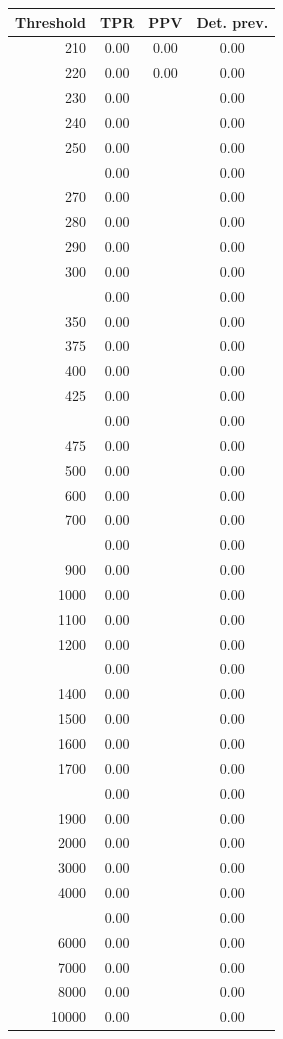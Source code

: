 \documentclass[12pt]{article}
\begin{document}
\begin{minipage}{0.5\textwidth}\small
\begin{tabular}{rccc}
\toprule
\textbf{Threshold} & \textbf{TPR} 
& \textbf{PPV} & \textbf{Det. prev.} \\
\midrule 
    210 & 0.00 & 0.00 & 0.00 \\ 
    220 & 0.00 & 0.00 & 0.00 \\ 
    230 & 0.00 &  & 0.00 \\ 
    240 & 0.00 &  & 0.00 \\ 
    250 & 0.00 &  & 0.00 \\  \addlinespace
    260 & 0.00 &  & 0.00 \\ 
    270 & 0.00 &  & 0.00 \\ 
    280 & 0.00 &  & 0.00 \\ 
    290 & 0.00 &  & 0.00 \\ 
    300 & 0.00 &  & 0.00 \\  \addlinespace
    325 & 0.00 &  & 0.00 \\ 
    350 & 0.00 &  & 0.00 \\ 
    375 & 0.00 &  & 0.00 \\ 
    400 & 0.00 &  & 0.00 \\ 
    425 & 0.00 &  & 0.00 \\  \addlinespace
    450 & 0.00 &  & 0.00 \\ 
    475 & 0.00 &  & 0.00 \\ 
    500 & 0.00 &  & 0.00 \\ 
    600 & 0.00 &  & 0.00 \\ 
    700 & 0.00 &  & 0.00 \\  \addlinespace
    800 & 0.00 &  & 0.00 \\ 
    900 & 0.00 &  & 0.00 \\ 
   1000 & 0.00 &  & 0.00 \\ 
   1100 & 0.00 &  & 0.00 \\ 
   1200 & 0.00 &  & 0.00 \\  \addlinespace
   1300 & 0.00 &  & 0.00 \\ 
   1400 & 0.00 &  & 0.00 \\ 
   1500 & 0.00 &  & 0.00 \\ 
   1600 & 0.00 &  & 0.00 \\ 
   1700 & 0.00 &  & 0.00 \\  \addlinespace
   1800 & 0.00 &  & 0.00 \\ 
   1900 & 0.00 &  & 0.00 \\ 
   2000 & 0.00 &  & 0.00 \\ 
   3000 & 0.00 &  & 0.00 \\ 
   4000 & 0.00 &  & 0.00 \\  \addlinespace
   5000 & 0.00 &  & 0.00 \\ 
   6000 & 0.00 &  & 0.00 \\ 
   7000 & 0.00 &  & 0.00 \\ 
   8000 & 0.00 &  & 0.00 \\ 
  10000 & 0.00 &  & 0.00 \\ 
\bottomrule
\end{tabular}

\end{minipage}
\end{document}
